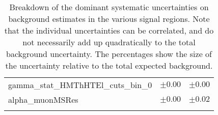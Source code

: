 \begin{table}
\begin{center}
\begin{tabular*}{\textwidth}{@{\extracolsep{\fill}}lcc}
gamma\_stat\_HMThHTEl\_cuts\_bin\_0         & $\pm 0.00$          & $\pm 0.00$       \\
alpha\_muonMSRes         & $\pm 0.00$          & $\pm 0.02$       \\
\noalign{\smallskip}\hline\noalign{\smallskip}
\end{tabular*}
\end{center}
\caption[Breakdown of uncertainty on background estimates]{
Breakdown of the dominant systematic uncertainties on background estimates in the various signal regions.
Note that the individual uncertainties can be correlated, and do not necessarily add up quadratically to 
the total background uncertainty. The percentages show the size of the uncertainty relative to the total expected background.
\label{table.results.bkgestimate.uncertainties.SRWEl_SRWMu}}
\end{table}
%